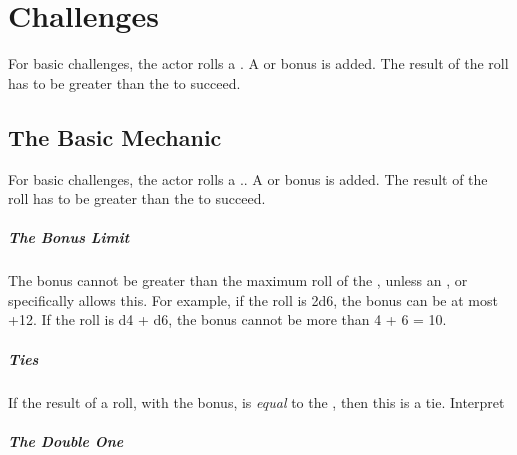 \documentclass{LegrandOrangeTufteBook}
\begin{document}
\chapterspaceabove{6.75cm}
\chapterspacebelow{11.25cm}


\chapter*{Challenges}

\begin{emphasisParagraph}
	For basic challenges, the actor rolls a .
	A  or  bonus is added.
	The result of the roll has to be greater than the  to succeed.
\end{emphasisParagraph}

\section*{The Basic Mechanic}
For basic challenges, the actor rolls a ..
A  or  bonus is added.
The result of the roll has to be greater than the  to succeed.\\

\paragraph*{The Bonus Limit}
The bonus cannot be greater than the maximum roll of the ,
unless an ,  or  specifically allows this.
For example, if the roll is 2d6, the bonus can be at most +12. If the roll is d4 + d6,
the bonus cannot be more than 4 + 6 = 10.\\

\paragraph*{Ties}
If the result of a roll, with the bonus, is \emph{equal} to the \acronymDL,
then this is a tie. Interpret

\paragraph*{The Double One}
\end{document}

